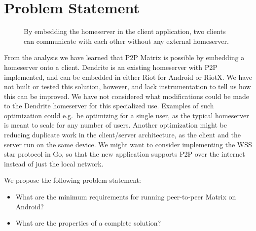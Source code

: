 \section{Problem Statement}
\begin{figure}
	\centering
	\resizebox{!}{!}{}
	\caption{
		By embedding the homeserver in the client application, two clients can communicate with each other without any external homeserver.
	}%
	\label{fig:p2p-embed}
\end{figure}
From the analysis we have learned that \ac{P2P} Matrix is possible by embedding a homeserver onto a client.
Dendrite is an existing homeserver with \ac{P2P} implemented, and can be embedded in either Riot for Android or RiotX.
We have not built or tested this solution, however, and lack instrumentation to tell us how this can be improved.
We have not considered what modifications could be made to the Dendrite homeserver for this specialized use.
Examples of such optimization could e.g.~be optimizing for a single user, as the typical homeserver is meant to scale for any number of users.
Another optimization might be reducing duplicate work in the client/server architecture, as the client and the server run on the same device.
We might want to consider implementing the WSS star protocol in Go, so that the new application supports \ac{P2P} over the internet instead of just the local network.


We propose the following problem statement:\\
\begin{itemize}
	\item What are the minimum requirements for running peer-to-peer Matrix on Android?
	\item What are the properties of a complete solution?
\end{itemize}